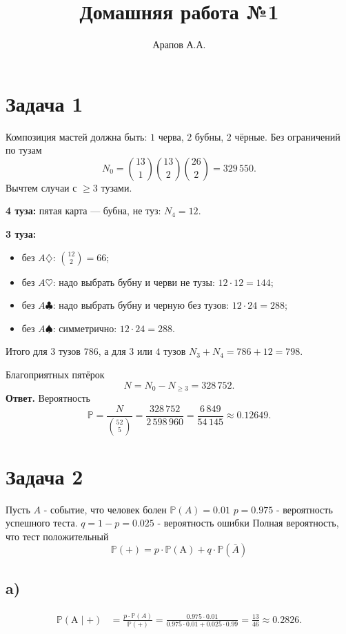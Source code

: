 \documentclass[12pt]{article}
\title{Домашняя работа №1}
\author{Арапов А.А.}
\date{}
\newcommand{\PP}{\mathbb{P}}
\begin{document}
    \maketitle


    \section*{Задача 1}
    Композиция мастей должна быть: $1$ черва, $2$ бубны, $2$ чёрные.
    Без ограничений по тузам
    \[
        N_0=\binom{13}{1}\binom{13}{2}\binom{26}{2}=329\,550.
    \]
    Вычтем случаи с $\ge3$ тузами.

    \textbf{4 туза:} пятая карта --- бубна, не туз: $N_4=12$.

    \textbf{3 туза:}
    \begin{itemize}
        \item без $A\diamondsuit$: $\binom{12}{2}=66$;
        \item без $A\heartsuit$: надо выбрать бубну и черви не тузы: $12\cdot12=144$;
        \item без $A\clubsuit$: надо выбрать бубну и черную без тузов: $12\cdot24=288$;
        \item без $A\spadesuit$: симметрично: $12\cdot24=288$.
    \end{itemize}
    Итого для $3$ тузов $786$, а для $3$ или $4$ тузов $N_3+N_4=786+12=798$.

    Благоприятных пятёрок
    \[
        N=N_0-N_{\ge3}=328\,752.
    \]
    \textbf{Ответ.}
    Вероятность
    \[
        \PP=\frac{N}{\binom{52}{5}}=\frac{328\,752}{2\,598\,960}=\frac{6\,849}{54\,145}\approx 0.12649.
    \]


    \section*{Задача 2}
    Пусть $A$ - событие, что человек болен $\PP(A)=0.01$
    $p=0.975$ - вероятность успешного теста. $q=1-p=0.025$ - вероятность ошибки
    Полная вероятность, что тест положительный
    \[
        \PP(+)=p\cdot\PP(\text{A})+q\cdot\PP(\bar{A})
    \]

    \subsection*{a)}
    \begin{align*}
        \PP(\text{A}\mid +)
        &=\frac{p\cdot\PP(A)}{\PP(+)}
        =\frac{0.975\cdot0.01}{0.975\cdot0.01+0.025\cdot0.99}
        =\frac{13}{46}\approx0.2826.
    \end{align*}
\end{document}
